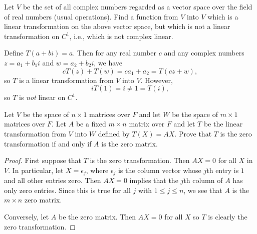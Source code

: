  Let $V$ be the set of all complex numbers regarded as a
vector space over the field of real numbers (usual operations). Find a
function from $V$ into $V$ which is a linear transformation on the
above vector space, but which is not a linear transformation on $C^1$,
i.e., which is not complex linear.
\begin{solution}
  Define $T(a + bi) = a$. Then for any real number $c$ and any
  complex numbers $z = a_1 + b_1i$ and $w = a_2 + b_2i$, we have
  \begin{equation*}
    cT(z) + T(w) = ca_1 + a_2 = T(cz + w),
  \end{equation*}
  so $T$ is a linear transformation from $V$ into $V$. However,
  \begin{equation*}
    iT(1) = i \neq 1 = T(i),
  \end{equation*}
  so $T$ is {\em not} linear on $C^1$.
\end{solution}

 Let $V$ be the space of $n\times1$ matrices over $F$ and
let $W$ be the space of $m\times1$ matrices over $F$. Let $A$ be a
fixed $m\times n$ matrix over $F$ and let $T$ be the linear
transformation from $V$ into $W$ defined by $T(X) = AX$. Prove that
$T$ is the zero transformation if and only if $A$ is the zero matrix.
\begin{proof}
  First suppose that $T$ is the zero transformation. Then $AX = 0$ for
  all $X$ in $V$. In particular, let $X = \epsilon_j$, where
  $\epsilon_j$ is the column vector whose $j$th entry is $1$ and all
  other entries zero. Then $AX = 0$ implies that the $j$th column of
  $A$ has only zero entries. Since this is true for all $j$ with
  $1\leq j\leq n$, we see that $A$ is the $m\times n$ zero matrix.

  Conversely, let $A$ be the zero matrix. Then $AX = 0$ for all $X$ so
  $T$ is clearly the zero transformation.
\end{proof}

